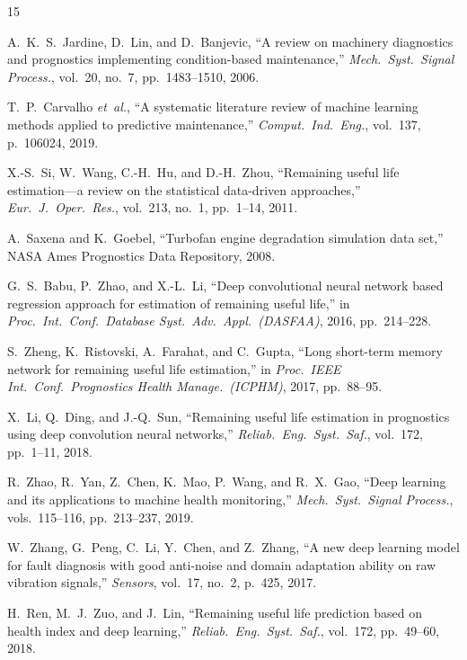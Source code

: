 \documentclass[conference]{IEEEtran}
\begin{document}
\begin{thebibliography}{15}

A.~K.~S.~Jardine, D.~Lin, and D.~Banjevic,
``A review on machinery diagnostics and prognostics implementing
condition-based maintenance,''
\textit{Mech.\ Syst.\ Signal Process.},
vol.~20, no.~7, pp.~1483--1510, 2006.

T.~P.~Carvalho \textit{et~al.},
``A systematic literature review of machine learning methods applied
to predictive maintenance,''
\textit{Comput.\ Ind.\ Eng.},
vol.~137, p.~106024, 2019.

X.-S.~Si, W.~Wang, C.-H.~Hu, and D.-H.~Zhou,
``Remaining useful life estimation---a review on the statistical
data-driven approaches,''
\textit{Eur.\ J.\ Oper.\ Res.},
vol.~213, no.~1, pp.~1--14, 2011.

A.~Saxena and K.~Goebel,
``Turbofan engine degradation simulation data set,''
NASA Ames Prognostics Data Repository, 2008.

G.~S.~Babu, P.~Zhao, and X.-L.~Li,
``Deep convolutional neural network based regression approach for
estimation of remaining useful life,''
in \textit{Proc.\ Int.\ Conf.\ Database Syst.\ Adv.\ Appl.\
(DASFAA)}, 2016, pp.~214--228.

S.~Zheng, K.~Ristovski, A.~Farahat, and C.~Gupta,
``Long short-term memory network for remaining useful life
estimation,''
in \textit{Proc.\ IEEE Int.\ Conf.\ Prognostics Health Manage.\
(ICPHM)}, 2017, pp.~88--95.

X.~Li, Q.~Ding, and J.-Q.~Sun,
``Remaining useful life estimation in prognostics using deep
convolution neural networks,''
\textit{Reliab.\ Eng.\ Syst.\ Saf.},
vol.~172, pp.~1--11, 2018.

R.~Zhao, R.~Yan, Z.~Chen, K.~Mao, P.~Wang, and R.~X.~Gao,
``Deep learning and its applications to machine health monitoring,''
\textit{Mech.\ Syst.\ Signal Process.},
vols.~115--116, pp.~213--237, 2019.

W.~Zhang, G.~Peng, C.~Li, Y.~Chen, and Z.~Zhang,
``A new deep learning model for fault diagnosis with good anti-noise
and domain adaptation ability on raw vibration signals,''
\textit{Sensors},
vol.~17, no.~2, p.~425, 2017.

H.~Ren, M.~J.~Zuo, and J.~Lin,
``Remaining useful life prediction based on health index and deep
learning,''
\textit{Reliab.\ Eng.\ Syst.\ Saf.},
vol.~172, pp.~49--60, 2018.


\end{thebibliography}
\end{document}
